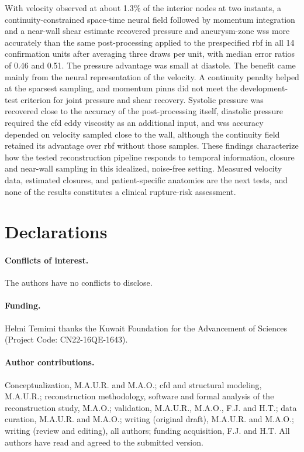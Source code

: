 \documentclass[12pt,a4paper]{article}
\newcommand{\CFD}{\ac{cfd}\xspace}
\newcommand{\PINNs}{\acp{pinn}\xspace}
\newcommand{\WSS}{\ac{wss}\xspace}
\newcommand{\RBF}{\ac{rbf}\xspace}
\theoremstyle{definition}
\numberwithin{equation}{section}
\newif\ifanonymized
\begin{document}
With velocity observed at about 1.3\% of the interior nodes at two instants, a continuity-constrained space-time neural field followed by momentum integration and a near-wall shear estimate recovered pressure and aneurysm-zone \WSS more accurately than the same post-processing applied to the prespecified \RBF in all 14 confirmation units after averaging three draws per unit, with median error ratios of 0.46 and 0.51. The pressure advantage was small at diastole. The benefit came mainly from the neural representation of the velocity. A continuity penalty helped at the sparsest sampling, and momentum \PINNs did not meet the development-test criterion for joint pressure and shear recovery. Systolic pressure was recovered close to the accuracy of the post-processing itself, diastolic pressure required the \CFD eddy viscosity as an additional input, and \WSS accuracy depended on velocity sampled close to the wall, although the continuity field retained its advantage over \RBF without those samples. These findings characterize how the tested reconstruction pipeline responds to temporal information, closure and near-wall sampling in this idealized, noise-free setting. Measured velocity data, estimated closures, and patient-specific anatomies are the next tests, and none of the results constitutes a clinical rupture-risk assessment.


\section*{Declarations}
\paragraph{Conflicts of interest.} The authors have no conflicts to disclose.

\ifanonymized
\paragraph{Funding and author contributions.} Removed for anonymized review.
\else
\paragraph{Funding.} Helmi Temimi thanks the Kuwait Foundation for the Advancement of Sciences (Project Code: CN22-16QE-1643).

\paragraph{Author contributions.} Conceptualization, M.A.U.R. and M.A.O.; \CFD and structural modeling, M.A.U.R.; reconstruction methodology, software and formal analysis of the reconstruction study, M.A.O.; validation, M.A.U.R., M.A.O., F.J. and H.T.; data curation, M.A.U.R. and M.A.O.; writing (original draft), M.A.U.R. and M.A.O.; writing (review and editing), all authors; funding acquisition, F.J. and H.T. All authors have read and agreed to the submitted version.
\fi
\end{document}
